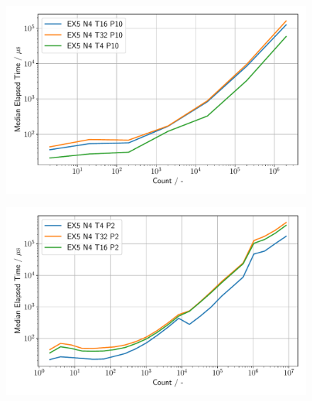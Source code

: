 \begin{figure}[h]
\centering
    \begin{minipage}{.5\textwidth}
        \centering
        \includegraphics[width=1.0\linewidth]{figures/Ex5_1.pdf}
        \label{Ex5_1_p}
    \end{minipage}%
    \begin{minipage}{.5\textwidth}
        \centering
        \includegraphics[width=1.0\linewidth]{figures/Ex5_2.pdf}
        \label{Ex5_2_p}
    \end{minipage}
\end{figure}


